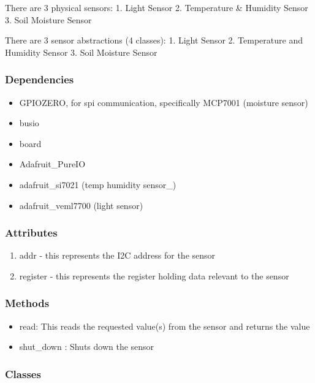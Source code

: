 \documentclass[
]{article}
\providecommand{\tightlist}{%
  \setlength{\itemsep}{0pt}\setlength{\parskip}{0pt}}
\begin{document}
There are 3 physical sensors: 1. Light Sensor 2. Temperature \& Humidity
Sensor 3. Soil Moisture Sensor

There are 3 sensor abstractions (4 classes): 1. Light Sensor 2.
Temperature and Humidity Sensor 3. Soil Moisture Sensor

\hypertarget{dependencies-1}{%
\subsubsection{Dependencies}\label{dependencies-1}}

\begin{itemize}
\tightlist
\item
  GPIOZERO, for spi communication, specifically MCP7001 (moisture
  sensor)
\item
  busio
\item
  board
\item
  Adafruit\_PureIO
\item
  adafruit\_si7021 (temp humidity sensor\_)
\item
  adafruit\_veml7700 (light sensor)
\end{itemize}

\hypertarget{attributes}{%
\subsubsection{Attributes}\label{attributes}}

\begin{enumerate}
\def\labelenumi{\arabic{enumi}.}
\tightlist
\item
  addr - this represents the I2C address for the sensor
\item
  register - this represents the register holding data relevant to the
  sensor
\end{enumerate}

\hypertarget{methods}{%
\subsubsection{Methods}\label{methods}}

\begin{itemize}
\tightlist
\item
  read: This reads the requested value(s) from the sensor and returns
  the value
\item
  shut\_down : Shuts down the sensor
\end{itemize}

\hypertarget{classes}{%
\subsubsection{Classes}\label{classes}}
\end{document}
